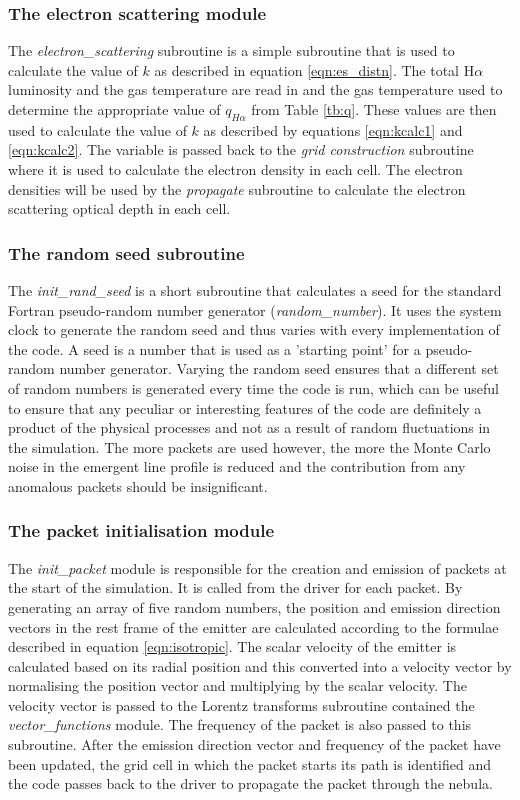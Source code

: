 		\subsubsection{The electron scattering module}
		The \textit{electron\_scattering} subroutine is a simple subroutine that is used to calculate the value of $k$ as described in equation \ref{eqn:es_distn}.  The total H$\alpha$ luminosity and the gas temperature are read in and the gas temperature used to determine the appropriate value of $q_{H\alpha}$ from Table \ref{tb:q}.  These values are then used to calculate the value of $k$ as described by equations \ref{eqn:kcalc1} and \ref{eqn:kcalc2}.  The variable is passed back to the \textit{grid construction} subroutine where it is used to calculate the electron density in each cell.  The electron densities will be used by the \textit{propagate} subroutine to calculate the electron scattering optical depth in each cell.
		
		\subsubsection{The random seed subroutine}
		The \textit{init\_rand\_seed} is a short subroutine that calculates a seed for the standard Fortran pseudo-random number generator (\textit{random\_number}).  It uses the system clock to generate the random seed and thus varies with every implementation of the code.  A seed is a number that is used as a 'starting point' for a pseudo-random number generator.  Varying the random seed ensures that a different set of random numbers is generated every time the code is run, which can be useful to ensure that any peculiar or interesting features of the code are definitely a product of the physical processes and not as a result of random fluctuations in the simulation.  The more packets are used however, the more the Monte Carlo noise in the emergent line profile is reduced and the contribution from any anomalous packets should be insignificant.
		
		\subsubsection{The packet initialisation module}
		The \textit{init\_packet} module is responsible for the creation and emission of packets at the start of the simulation.  It is called from the driver for each packet.  By generating an array of five random numbers, the position and emission direction vectors in the rest frame of the emitter are calculated according to the formulae described in equation \ref{eqn:isotropic}.  The scalar velocity of the emitter is calculated based on its radial position and this converted into a velocity vector by normalising the position vector and multiplying by the scalar velocity.  The velocity vector is passed to the Lorentz transforms subroutine contained the \textit{vector\_functions}  module.  The frequency of the packet is also passed to this subroutine.  After the emission direction vector and frequency of the packet have been updated, the grid cell in which the packet starts its path is identified and the code passes back to the driver to propagate the packet through the nebula.
		
